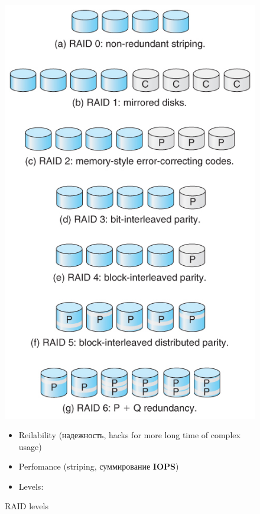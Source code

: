 \documentclass[../../lectures.tex]{subfiles}
\begin{document}
\begin{figure}[H]
\begin{minipage}[c]{0.5\linewidth}
\centering
\includegraphics[width=\textwidth]{images/raid-levels.jpg}
\caption{RAID levels}
\end{minipage}
\begin{minipage}[c]{0.5\linewidth}
\centering
\begin{itemize}
    \item Reilability (надежность, hacks for more long time of complex usage)
    \item Perfomance (striping, суммирование \textbf{IOPS})
    \item Levels:

\end{itemize}
\end{minipage}
\end{figure}
\end{document}
